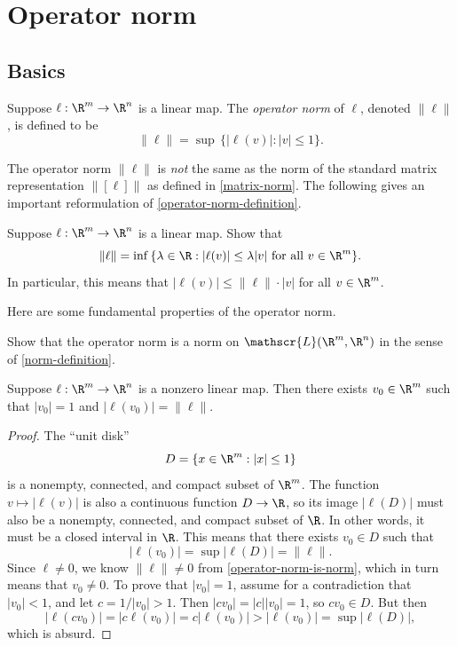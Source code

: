 \section{Operator norm} \label{operator-norm}

\subsection{Basics} \label{operator-norm-basic}

\begin{definition} \label{operator-norm-definition}
	Suppose $\ell : \R^m \to \R^n$ is a linear map. The \emph{operator norm} of $\ell$, denoted $\|\ell\|$, is defined to be
	\[ \|\ell\| = \sup\, \{ |\ell(v)| : |v| \leq 1 \}. \]
\end{definition} 

The operator norm $\|\ell\|$ is \emph{not} the same as the norm of the standard matrix representation $\|[\ell]\|$ as defined in \cref{matrix-norm}. The following gives an important reformulation of \cref{operator-norm-definition}.  

\begin{exercise} \label{operator-norm-reformulation}
	Suppose $\ell : \R^m \to \R^n$ is a linear map. Show that 
	\[ \|\ell\| = \inf \, \{ \lambda \in \R : |\ell(v)| \leq \lambda |v| \text{ for all } v \in \R^m \}. \]
	In particular, this means that $|\ell(v)| \leq \|\ell\| \cdot |v|$ for all $v \in \R^m$. 
\end{exercise}

Here are some fundamental properties of the operator norm. 

\begin{exercise} \label{operator-norm-is-norm}
	Show that the operator norm is a norm on $\mathscr{L}(\R^m, \R^n)$ in the sense of \cref{norm-definition}. 
\end{exercise}

\begin{lemma} \label{norm-is-realized}
	Suppose $\ell : \R^m \to \R^n$ is a nonzero linear map. Then there exists $v_0 \in \R^m$ such that $|v_0| = 1$ and $|\ell(v_0)| = \|\ell\|$. 
\end{lemma}

\begin{proof}
	The ``unit disk'' \[ D = \{ x \in \R^m : |x| \leq 1 \} \]
	is a nonempty, connected, and compact subset of $\R^m$. The function $v \mapsto |\ell(v)|$ is also a continuous function $D \to \R$, so its image $|\ell(D)|$ must also be a nonempty, connected, and compact subset of $\R$. In other words, it must be a closed interval in $\R$. This means that there exists $v_0 \in D$ such that 
	\[ |\ell(v_0)| = \sup |\ell(D)| = \|\ell\|. \]
	Since $\ell \neq 0$, we know $\|\ell\| \neq 0$ from \cref{operator-norm-is-norm}, which in turn means that $v_0 \neq 0$. To prove that $|v_0| = 1$, assume for a contradiction that $|v_0| < 1$, and let $c = 1/|v_0| > 1$. Then $|cv_0| = |c||v_0| = 1$, so $cv_0 \in D$. But then
	\[ |\ell(cv_0)| = |c\ell(v_0)| = c|\ell(v_0)| > |\ell(v_0)| = \sup |\ell(D)|, \]
	which is absurd. 
\end{proof}

